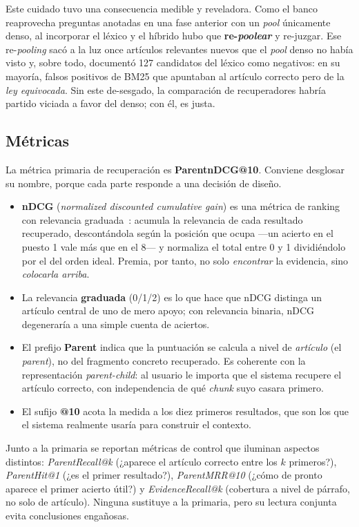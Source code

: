 Este cuidado tuvo una consecuencia medible y reveladora. Como el banco reaprovecha preguntas anotadas en una fase anterior con un \emph{pool} únicamente denso, al incorporar el léxico y el híbrido hubo que \textbf{re-\emph{poolear}} y re-juzgar. Ese re-\emph{pooling} sacó a la luz once artículos relevantes nuevos que el \emph{pool} denso no había visto y, sobre todo, documentó 127 candidatos del léxico como negativos: en su mayoría, falsos positivos de BM25 que apuntaban al artículo correcto pero de la \emph{ley equivocada}. Sin este de-sesgado, la comparación de recuperadores habría partido viciada a favor del denso; con él, es justa.

\subsection{Métricas}
\label{subsec:metricas}

La métrica primaria de recuperación es \textbf{ParentnDCG@10}. Conviene desglosar su nombre, porque cada parte responde a una decisión de diseño.

\begin{itemize}
  \item \textbf{nDCG} (\emph{normalized discounted cumulative gain}) es una métrica de ranking con relevancia graduada~\cite{jarvelin2002ndcg}: acumula la relevancia de cada resultado recuperado, descontándola según la posición que ocupa —un acierto en el puesto 1 vale más que en el 8— y normaliza el total entre 0 y 1 dividiéndolo por el del orden ideal. Premia, por tanto, no solo \emph{encontrar} la evidencia, sino \emph{colocarla arriba}.
  \item La relevancia \textbf{graduada} (0/1/2) es lo que hace que nDCG distinga un artículo central de uno de mero apoyo; con relevancia binaria, nDCG degeneraría a una simple cuenta de aciertos.
  \item El prefijo \textbf{Parent} indica que la puntuación se calcula a nivel de \emph{artículo} (el \emph{parent}), no del fragmento concreto recuperado. Es coherente con la representación \emph{parent-child}: al usuario le importa que el sistema recupere el artículo correcto, con independencia de qué \emph{chunk} suyo casara primero.
  \item El sufijo \textbf{@10} acota la medida a los diez primeros resultados, que son los que el sistema realmente usaría para construir el contexto.
\end{itemize}

Junto a la primaria se reportan métricas de control que iluminan aspectos distintos: \emph{ParentRecall@k} (¿aparece el artículo correcto entre los $k$ primeros?), \emph{ParentHit@1} (¿es el primer resultado?), \emph{ParentMRR@10} (¿cómo de pronto aparece el primer acierto útil?) y \emph{EvidenceRecall@k} (cobertura a nivel de párrafo, no solo de artículo). Ninguna sustituye a la primaria, pero su lectura conjunta evita conclusiones engañosas.


